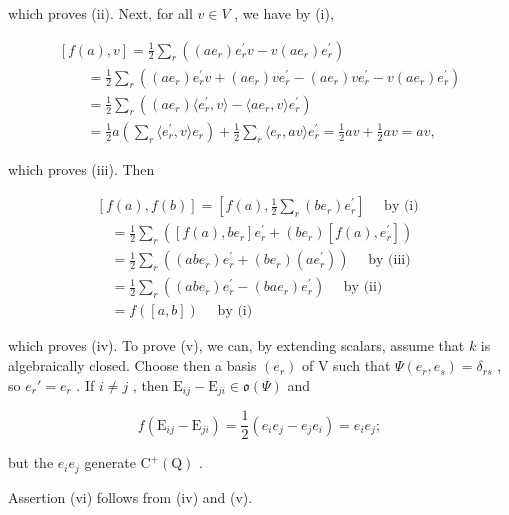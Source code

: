 which proves (ii). Next, for all \(v \in V\) , we have by (i),

\[
\begin{array}{l} [ f (a), v ] = \frac {1}{2} \sum_ {r} ((a e _ {r}) e _ {r} ^ {\prime} v - v (a e _ {r}) e _ {r} ^ {\prime}) \\ \qquad = \frac {1}{2} \sum_ {r} ((a e _ {r}) e _ {r} ^ {\prime} v + (a e _ {r}) v e _ {r} ^ {\prime} - (a e _ {r}) v e _ {r} ^ {\prime} - v (a e _ {r}) e _ {r} ^ {\prime}) \\ \qquad = \frac {1}{2} \sum_ {r} ((a e _ {r}) \langle e _ {r} ^ {\prime}, v \rangle - \langle a e _ {r}, v \rangle e _ {r} ^ {\prime}) \\ \qquad = \frac {1}{2} a \left(\sum_ {r} \langle e _ {r} ^ {\prime}, v \rangle e _ {r}\right) + \frac {1}{2} \sum_ {r} \langle e _ {r}, a v \rangle e _ {r} ^ {\prime} = \frac {1}{2} a v + \frac {1}{2} a v = a v, \end{array}
\]

which proves (iii). Then

\[
\begin{array}{l} [ f (a), f (b) ] = \left[ f (a), \frac {1}{2} \sum_ {r} (b e _ {r}) e _ {r} ^ {\prime} \right] \quad \text { by   (i) } \\ \quad = \frac {1}{2} \sum_ {r} ([ f (a), b e _ {r} ] e _ {r} ^ {\prime} + (b e _ {r}) [ f (a), e _ {r} ^ {\prime} ]) \\ \quad = \frac {1}{2} \sum_ {r} ((a b e _ {r}) e _ {r} ^ {\prime} + (b e _ {r}) (a e _ {r} ^ {\prime})) \quad \text { by   (iii) } \\ \quad = \frac {1}{2} \sum_ {r} ((a b e _ {r}) e _ {r} ^ {\prime} - (b a e _ {r}) e _ {r} ^ {\prime}) \quad \text { by   (ii) } \\ \quad = f ([ a, b ]) \quad \text { by   (i) } \end{array}
\]

which proves (iv). To prove (v), we can, by extending scalars, assume that \(k\) is algebraically closed. Choose then a basis \((e_r)\) of V such that \(\varPsi(e_r, e_s) = \delta_{rs}\) , so \(e_r' = e_r\) . If \(i \neq j\) , then \(\mathrm{E}_{ij} - \mathrm{E}_{ji} \in \mathfrak{o}(\varPsi)\) and

\[
f (\mathrm{E} _ {i j} - \mathrm{E} _ {j i}) = \frac {1}{2} (e _ {i} e _ {j} - e _ {j} e _ {i}) = e _ {i} e _ {j};
\]

but the \(e_{i}e_{j}\) generate \(\mathrm{C}^{+}(\mathrm{Q})\) .

Assertion (vi) follows from (iv) and (v).

